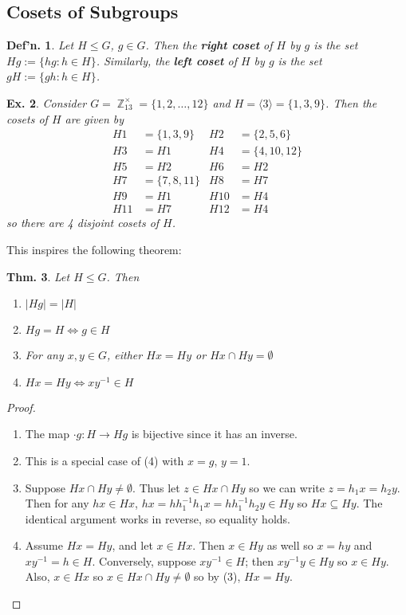 \documentclass[12pt, a4paper]{book}
\DeclareMathOperator{\Z}{\mathbb{Z}}
\newtheorem{theorem}{Thm.}[section]
\newtheorem{definition}[theorem]{Def'n.}
\newtheorem{example}[theorem]{Ex.}
\theoremstyle{nonumberplain}
\newtheorem{proof}{Proof}
\begin{document}
\subsection{Cosets of Subgroups}
\begin{definition}
    Let $H\leq G$, $g\in G$.
    Then the \textbf{right coset} of $H$ by $g$ is the set $Hg:=\{hg:h\in H\}$.
    Similarly, the \textbf{left coset} of $H$ by $g$ is the set $gH:=\{gh:h\in H\}$.
\end{definition}
\begin{example}
    Consider $G=\Z_{13}^\times=\{1,2,\ldots,12\}$ and $H=\langle 3\rangle=\{1,3,9\}$.
    Then the cosets of $H$ are given by
    \begin{align*}
        H1 &= \{1,3,9\} & H2 &= \{2,5,6\}\\
        H3 &= H1 & H4 &= \{4,10,12\}\\
        H5 &= H2 & H6 &= H2\\
        H7 &= \{7,8,11\} & H8 &= H7\\
        H9 &= H1 & H10 &= H4\\
        H11 &= H7 & H12 &= H4
    \end{align*}
    so there are 4 disjoint cosets of $H$.
\end{example}
This inspires the following theorem:
\begin{theorem}
    Let $H\leq G$.
    Then
    \begin{enumerate}[nolistsep]
        \item $|Hg|=|H|$
        \item $Hg=H\Leftrightarrow g\in H$
        \item For any $x,y\in G$, either $Hx=Hy$ or $Hx\cap Hy=\emptyset$
        \item $Hx=Hy\Leftrightarrow xy^{-1}\in H$
    \end{enumerate}
\end{theorem}
\begin{proof}
    \begin{enumerate}
        \item The map $\cdot g:H\to Hg$ is bijective since it has an inverse.
        \item This is a special case of (4) with $x=g$, $y=1$.
        \item Suppose $Hx\cap Hy\neq\emptyset$.
            Thus let $z\in Hx\cap Hy$ so we can write $z=h_1x=h_2y$.
            Then for any $hx\in Hx$, $hx=hh_1^{-1}h_1x=hh_1^{-1}h_2y\in Hy$ so $Hx\subseteq Hy$.
            The identical argument works in reverse, so equality holds.
        \item Assume $Hx=Hy$, and let $x\in Hx$.
            Then $x\in Hy$ as well so $x=hy$ and $xy^{-1}=h\in H$.
            Conversely, suppose $xy^{-1}\in H$; then $xy^{-1}y\in Hy$ so $x\in Hy$.
            Also, $x\in Hx$ so $x\in Hx\cap Hy\neq\emptyset$ so by (3), $Hx=Hy$.
    \end{enumerate}
\end{proof}
\end{document}
